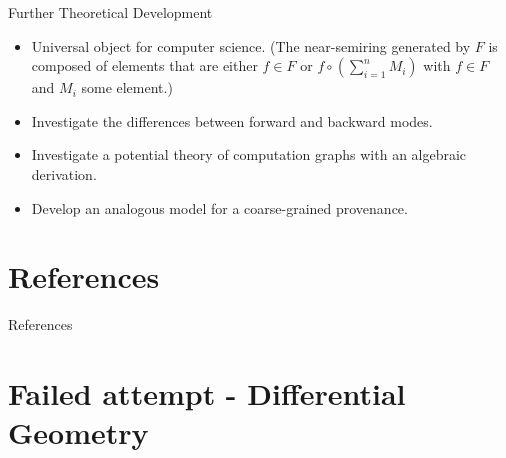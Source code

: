 \documentclass[11pt]{beamer}
\begin{document}
\begin{frame}{Further Theoretical Development}

\begin{itemize}

	\item Universal object for computer science. (The near-semiring generated by $F$ is composed of elements that are either $f \in F$ or $f \circ (\sum_{i=1}^n M_i)$ with $f \in F$ and $M_i$ some element.)
	
	\item Investigate the differences between forward and backward modes.

	\item Investigate a potential theory of computation graphs with an algebraic derivation.

	\item Develop an analogous model for a coarse-grained provenance.

\end{itemize}

\end{frame}

\section{References}
\begin{frame}{References}




\end{frame}

\section{Failed attempt - Differential Geometry}

\begin{frame}



\end{frame}

\cite{ramusat_semiring-based_2022}
\end{document}
